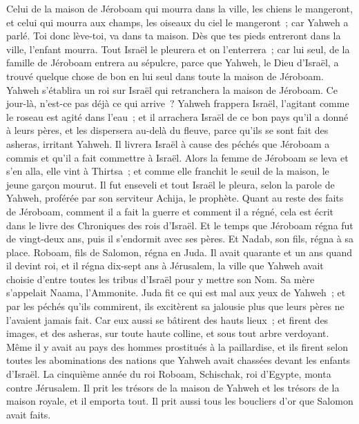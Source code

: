 \begin{multicols}{2}
Celui de la maison de Jéroboam qui mourra dans la ville, les chiens le mangeront, et celui qui mourra aux champs, les oiseaux du ciel le mangeront~; car Yahweh a parlé.
Toi donc lève-toi, va dans ta maison. Dès que tes pieds entreront dans la ville, l'enfant mourra.
Tout Israël le pleurera et on l'enterrera~; car lui seul, de la famille de Jéroboam entrera au sépulcre, parce que Yahweh, le Dieu d'Israël, a trouvé quelque chose de bon en lui seul dans toute la maison de Jéroboam.
Yahweh s'établira un roi sur Israël qui retranchera la maison de Jéroboam. Ce jour-là, n'est-ce pas déjà ce qui arrive~?
Yahweh frappera Israël, l'agitant comme le roseau est agité dans l'eau~; et il arrachera Israël de ce bon pays qu'il a donné à leurs pères, et les dispersera au-delà du fleuve, parce qu'ils se sont fait des asheras, irritant Yahweh.
Il livrera Israël à cause des péchés que Jéroboam a commis et qu'il a fait commettre à Israël.
Alors la femme de Jéroboam se leva et s'en alla, elle vint à Thirtsa~; et comme elle franchit le seuil de la maison, le jeune garçon mourut.
Il fut enseveli et tout Israël le pleura, selon la parole de Yahweh, proférée par son serviteur Achija, le prophète.
Quant au reste des faits de Jéroboam, comment il a fait la guerre et comment il a régné, cela est écrit dans le livre des Chroniques des rois d'Israël.
Et le temps que Jéroboam régna fut de vingt-deux ans, puis il s'endormit avec ses pères. Et Nadab, son fils, régna à sa place.
Roboam, fils de Salomon, régna en Juda. Il avait quarante et un ans quand il devint roi, et il régna dix-sept ans à Jérusalem, la ville que Yahweh avait choisie d'entre toutes les tribus d'Israël pour y mettre son Nom. Sa mère s'appelait Naama, l'Ammonite.
Juda fit ce qui est mal aux yeux de Yahweh~; et par les péchés qu'ils commirent, ils excitèrent sa jalousie plus que leurs pères ne l'avaient jamais fait.
Car eux aussi se bâtirent des hauts lieux~; et firent des images, et des asheras, sur toute haute colline, et sous tout arbre verdoyant.
Même il y avait au pays des hommes prostitués à la paillardise, et ils firent selon toutes les abominations des nations que Yahweh avait chassées devant les enfants d'Israël.
La cinquième année du roi Roboam, Schischak, roi d'Egypte, monta contre Jérusalem.
Il prit les trésors de la maison de Yahweh et les trésors de la maison royale, et il emporta tout. Il prit aussi tous les boucliers d'or que Salomon avait faits.

\end{multicols}
